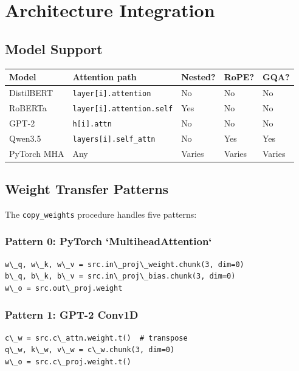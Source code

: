 \section{Architecture Integration}

\subsection{Model Support}

\begin{table}[H]
\centering
\small
\begin{tabular}{lllll}
\toprule
\textbf{Model} & \textbf{Attention path} & \textbf{Nested?} & \textbf{RoPE?} & \textbf{GQA?} \\
\midrule
DistilBERT & \texttt{layer[i].attention} & No & No & No \\
RoBERTa & \texttt{layer[i].attention.self} & Yes & No & No \\
GPT-2 & \texttt{h[i].attn} & No & No & No \\
Qwen3.5 & \texttt{layers[i].self\_attn} & No & Yes & Yes \\
PyTorch MHA & Any & Varies & Varies & Varies \\
\bottomrule
\end{tabular}
\end{table}

\subsection{Weight Transfer Patterns}

The \texttt{copy\_weights} procedure handles five patterns:

\subsubsection{Pattern 0: PyTorch `MultiheadAttention`}

\begin{lstlisting}
w\_q, w\_k, w\_v = src.in\_proj\_weight.chunk(3, dim=0)
b\_q, b\_k, b\_v = src.in\_proj\_bias.chunk(3, dim=0)
w\_o = src.out\_proj.weight
\end{lstlisting}

\subsubsection{Pattern 1: GPT-2 Conv1D}

\begin{lstlisting}
c\_w = src.c\_attn.weight.t()  # transpose
q\_w, k\_w, v\_w = c\_w.chunk(3, dim=0)
w\_o = src.c\_proj.weight.t()
\end{lstlisting}


